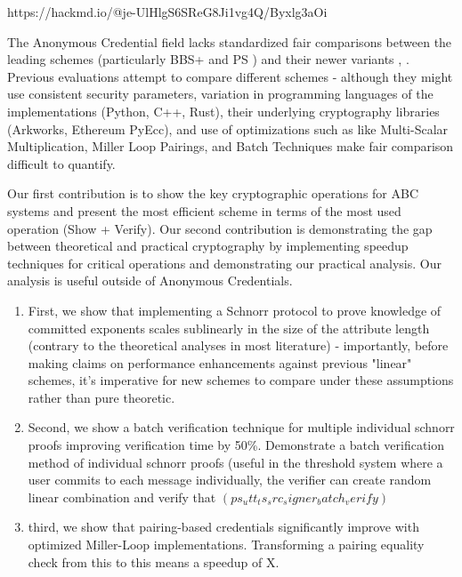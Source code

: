https://hackmd.io/@je-UlHlgS6SReG8Ji1vg4Q/Byxlg3aOi













The Anonymous Credential field lacks standardized fair comparisons between the leading schemes (particularly BBS+ \cite{hutchison_constant-size_2006} and PS \cite{sako_short_2016}) and their newer variants \cite{camenisch_anonymous_2016}, \cite{tomescu_utt_2022}. Previous evaluations attempt to compare different schemes - although they might use consistent security parameters, variation in programming languages of the implementations (Python, C++, Rust), their underlying cryptography libraries (Arkworks, Ethereum PyEcc), and use of optimizations such as like Multi-Scalar Multiplication, Miller Loop Pairings, and Batch Techniques make fair comparison difficult to quantify. 



Our first contribution is to show the key cryptographic operations for ABC systems and present the most efficient scheme in terms of the most used operation (Show + Verify). 
Our second contribution is demonstrating the gap between theoretical and practical cryptography by implementing speedup techniques for critical operations and demonstrating our practical analysis. Our analysis is useful outside of Anonymous Credentials.
\begin{enumerate}
    \item First, we show that implementing a Schnorr protocol to prove knowledge of committed exponents scales sublinearly in the size of the attribute length (contrary to the theoretical analyses in most literature) - importantly, before making claims on performance enhancements against previous "linear" schemes, it's imperative for new schemes to compare under these assumptions rather than pure theoretic. 

    \item Second, we show a batch verification technique for multiple individual schnorr proofs improving verification time by 50\%. Demonstrate a batch verification method of individual schnorr proofs (useful in the threshold system where a user commits to each message individually, the verifier can create random linear combination and verify that $(ps_utt_ts_src_signer_batch_verify)$

    \item third, we show that pairing-based credentials significantly improve with optimized Miller-Loop implementations. Transforming a pairing equality check from this to this means a speedup of X. 
\end{enumerate}










